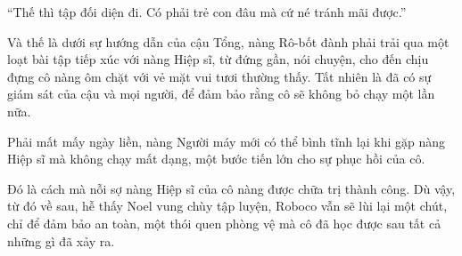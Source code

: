\documentclass[../main.tex]{subfiles}
\begin{document}
``Thế thì tập đối diện đi. Có phải trẻ con đâu mà cứ né tránh mãi được.''

Và thế là dưới sự hướng dẫn của cậu Tổng, nàng Rô-bốt đành phải trải qua một loạt bài tập tiếp xúc với nàng Hiệp sĩ, từ đứng gần, nói chuyện, cho đến chịu đựng cô nàng ôm chặt với vẻ mặt vui tươi thường thấy. Tất nhiên là đã có sự giám sát của cậu và mọi người, để đảm bảo rằng cô sẽ không bỏ chạy một lần nữa.

Phải mất mấy ngày liền, nàng Người máy mới có thể bình tĩnh lại khi gặp nàng Hiệp sĩ mà không chạy mất dạng, một bước tiến lớn cho sự phục hồi của cô.

Đó là cách mà nỗi sợ nàng Hiệp sĩ của cô nàng được chữa trị thành công. Dù vậy, từ đó về sau, hễ thấy Noel vung chùy tập luyện, Roboco vẫn sẽ lùi lại một chút, chỉ để đảm bảo an toàn, một thói quen phòng vệ mà cô đã học được sau tất cả những gì đã xảy ra.
\end{document}
